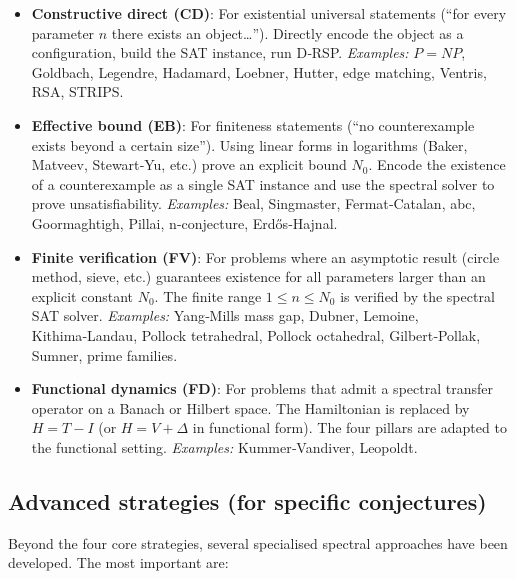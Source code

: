 \documentclass[11pt,a4paper]{article}
\begin{document}
\begin{itemize}
\item \textbf{Constructive direct (CD)}: For existential universal statements (“for every parameter \(n\) there exists an object…”). Directly encode the object as a configuration, build the SAT instance, run D‑RSP.  
  \textit{Examples:} \(P = NP\), Goldbach, Legendre, Hadamard, Loebner, Hutter, edge matching, Ventris, RSA, STRIPS.

\item \textbf{Effective bound (EB)}: For finiteness statements (“no counterexample exists beyond a certain size”). Using linear forms in logarithms (Baker, Matveev, Stewart‑Yu, etc.) prove an explicit bound \(N_0\). Encode the existence of a counterexample as a single SAT instance and use the spectral solver to prove unsatisfiability.  
  \textit{Examples:} Beal, Singmaster, Fermat‑Catalan, abc, Goormaghtigh, Pillai, n‑conjecture, Erdős‑Hajnal.

\item \textbf{Finite verification (FV)}: For problems where an asymptotic result (circle method, sieve, etc.) guarantees existence for all parameters larger than an explicit constant \(N_0\). The finite range \(1 \leq n \leq N_0\) is verified by the spectral SAT solver.  
  \textit{Examples:} Yang‑Mills mass gap, Dubner, Lemoine, Kithima‑Landau, Pollock tetrahedral, Pollock octahedral, Gilbert‑Pollak, Sumner, prime families.

\item \textbf{Functional dynamics (FD)}: For problems that admit a spectral transfer operator on a Banach or Hilbert space. The Hamiltonian is replaced by \(H = T - I\) (or \(H = V + \Delta\) in functional form). The four pillars are adapted to the functional setting.  
  \textit{Examples:} Kummer‑Vandiver, Leopoldt.
\end{itemize}

\subsection{Advanced strategies (for specific conjectures)}

Beyond the four core strategies, several specialised spectral approaches have been developed. The most important are:
\end{document}
